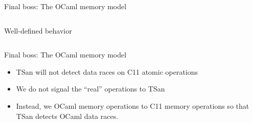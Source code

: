 \begin{frame}{Final boss: The OCaml memory model}
  \begin{columns}
    \begin{column}{0.45\textwidth}
      \color{mComplA}{\rule[1em]{\textwidth}{0.1pt}}
    \end{column}
    \begin{column}{0.45\textwidth}
      \color{mComplA}{\rule[1em]{\textwidth}{0.1pt}}
    \end{column}
  \end{columns}
  \medskip
  \begin{columns}
    \begin{column}{0.45\textwidth}

      \greencheck{} Well-defined behavior
    \end{column}
    \begin{column}{0.45\textwidth}

    \end{column}
  \end{columns}
\end{frame}


\begin{frame}{Final boss: The OCaml memory model}
  \begin{itemize}
    \item TSan will not detect data races on C11 atomic operations
    \item We do not signal the ``real'' operations to TSan
    \item Instead, we  OCaml memory operations to C11 memory operations so that TSan detects OCaml data races.
  \end{itemize}
\end{frame}
